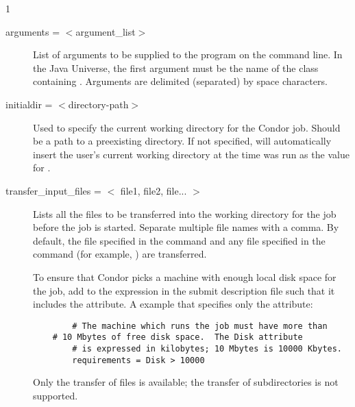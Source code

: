 \begin{ManPage}{\label{man-condor-submit}}{1}
\begin{description}

\item[arguments = $<$argument\_list$>$] List of arguments to be supplied
to the program on the command line.   In the Java Universe, the first
argument must be the name of the class containing .
Arguments are delimited (separated) by space characters.


\item[initialdir = $<$directory-path$>$] Used to specify the current
working directory for the Condor job. Should be a path to a preexisting
directory. If not specified,  will automatically insert
the user's current working directory at the time  was run
as the value for . 


\item[transfer\_input\_files = $<$ file1, file2, file... $>$] 
Lists all the files to be transferred into the 
working directory for the job before the job is started.
Separate multiple file names with a comma.
By default, the file specified in the
 command and any file specified in the 
command (for example, ) are transferred.

To ensure
that Condor picks a machine with enough local disk space for the job,
add to the 
expression in the submit description file such that it includes
the  attribute.
A  example that specifies only the  attribute:
\begin{verbatim}
        # The machine which runs the job must have more than
	# 10 Mbytes of free disk space.  The Disk attribute
        # is expressed in kilobytes; 10 Mbytes is 10000 Kbytes.
        requirements = Disk > 10000
\end{verbatim}

Only the transfer of files is available; the transfer of
subdirectories is not supported.



\end{description}
\end{ManPage}
